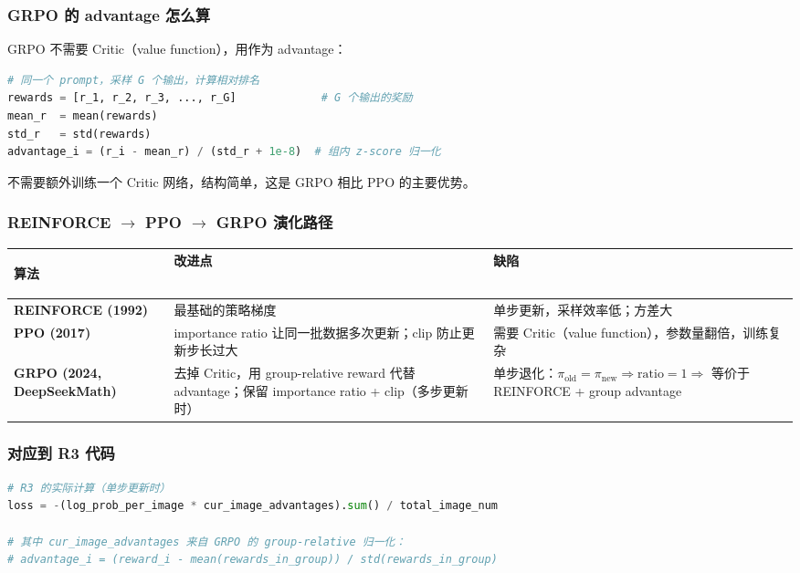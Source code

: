 \subsubsection{GRPO 的 advantage 怎么算}

GRPO 不需要 Critic（value function），用作为 advantage：

\begin{lstlisting}[language=Python]
# 同一个 prompt，采样 G 个输出，计算相对排名
rewards = [r_1, r_2, r_3, ..., r_G]             # G 个输出的奖励
mean_r  = mean(rewards)
std_r   = std(rewards)
advantage_i = (r_i - mean_r) / (std_r + 1e-8)  # 组内 z-score 归一化
\end{lstlisting}

不需要额外训练一个 Critic 网络，结构简单，这是 GRPO 相比 PPO 的主要优势。

\subsubsection{REINFORCE $\to$ PPO $\to$ GRPO 演化路径}

\begin{center}
\begin{tabular}{>{\bfseries}p{3.2cm} p{5.0cm} p{5.0cm}}
\hline
\rule{0pt}{2.4ex}
算法 & 改进点 & 缺陷 \\
\hline
REINFORCE (1992)
    & 最基础的策略梯度
    & 单步更新，采样效率低；方差大 \\
PPO (2017)
    & importance ratio 让同一批数据多次更新；clip 防止更新步长过大
    & 需要 Critic（value function），参数量翻倍，训练复杂 \\
GRPO (2024, DeepSeekMath)
    & 去掉 Critic，用 group-relative reward 代替 advantage；保留 importance ratio + clip（多步更新时）
    & 单步退化：$\pi_{\mathrm{old}} = \pi_{\mathrm{new}} \Rightarrow \text{ratio} = 1
      \Rightarrow$ 等价于 REINFORCE + group advantage \\
\hline
\end{tabular}
\end{center}

\subsubsection{对应到 R3 代码}

\begin{lstlisting}[language=Python]
# R3 的实际计算（单步更新时）
loss = -(log_prob_per_image * cur_image_advantages).sum() / total_image_num

# 其中 cur_image_advantages 来自 GRPO 的 group-relative 归一化：
# advantage_i = (reward_i - mean(rewards_in_group)) / std(rewards_in_group)
\end{lstlisting}


